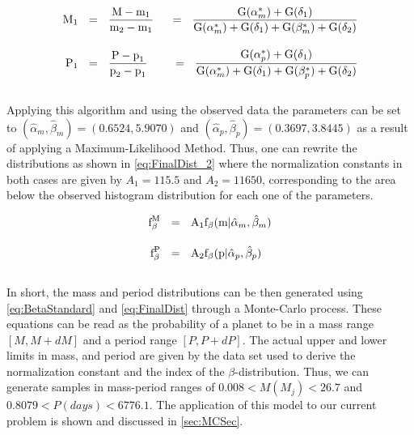 \begingroup
\Large
\begin{equation}
  \begin{align*}
    \textnormal{M}_1~~ &=~~  \frac{\textnormal{M} - \textnormal{m}_1}{\textnormal{m}_2 - \textnormal{m}_1} ~~&= ~~\frac{\textnormal{G}(\alpha^*_m)+\textnormal{G}(\delta_1)}{\textnormal{G}(\alpha^*_m)+\textnormal{G}(\delta_1)+\textnormal{G}(\beta^*_m)+\textnormal{G}(\delta_2)}\\[10pt]
    \textnormal{P}_1 ~~&= ~~\frac{\textnormal{P} - \textnormal{p}_1}{\textnormal{p}_2 - \textnormal{p}_1} ~~&=~~ \frac{\textnormal{G}(\alpha^*_p)+\textnormal{G}(\delta_1)}{\textnormal{G}(\alpha^*_m)+\textnormal{G}(\delta_1)+\textnormal{G}(\beta^*_p)+\textnormal{G}(\delta_2)}
    \label{eq:CorrelatedPairs}
  \end{align*}
\end{equation}
\endgroup\\

Applying this algorithm and using the observed data the parameters can be set to $(\hat{\alpha}_m, \hat{\beta}_m) = (0.6524, 5.9070)$ and $(\hat{\alpha}_p, \hat{\beta}_p) = (0.3697, 3.8445)$ as a result of applying a Maximum-Likelihood Method. Thus, one can rewrite the distributions as shown in \autoref{eq:FinalDist_2} where the normalization constants in both cases are given by $A_1 = 115.5$ and $A_2 = 11650$, corresponding to the area below the observed histogram distribution for each one of the parameters.

\begingroup
\Large
\begin{equation}
  \begin{align*}
    \textnormal{f}_\beta^{\textnormal{M}}~~ & = ~~\textnormal{A}_1\textnormal{f}_\beta(\textnormal{m}|\hat{\alpha}_m, \hat{\beta}_m) \\[10pt]
    \textnormal{f}_\beta^{\textnormal{P}}~~ & = ~~\textnormal{A}_2\textnormal{f}_\beta(\textnormal{p}|\hat{\alpha}_p, \hat{\beta}_p)
    \label{eq:FinalDist_2}
  \end{align*}
\end{equation}
\endgroup\\

In short, the mass and period distributions can be then generated using \autoref{eq:BetaStandard} and \autoref{eq:FinalDist} through a Monte-Carlo process. These equations can be read as the probability of a planet to be in a mass range $[M, M + dM]$ and a period range $[P, P + dP]$. The actual upper and lower limits in mass, and period are given by the data set used to derive the normalization constant and the index of the $\beta$-distribution. Thus, we can generate samples in mass-period ranges of $0.008 < M(M_j) < 26.7$ and $0.8079 < P(days) < 6776.1$. The application of this model to our current problem is shown and discussed in \autoref{sec:MCSec}.

